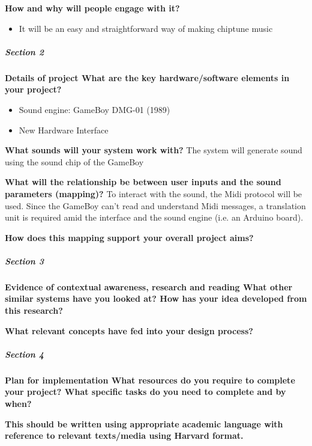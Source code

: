 \documentclass[]{article}
\begin{document}
    \textbf{How and why will people engage with it?}

        \begin{itemize}
        \item It will be an easy and straightforward way of making chiptune music
        \end{itemize}

\subparagraph[]{Section 2}

    \textbf{Details of project What are the key hardware/software elements in your
    project?}

        \begin{itemize}
            \item Sound engine: GameBoy DMG-01 (1989)
            \item New Hardware Interface
        \end{itemize}

    \textbf{What sounds will your system work with?}
    The system will generate sound using the sound chip of the GameBoy

    \textbf{What will the relationship be between user inputs and the sound 
    parameters (mapping)?} 
    To interact with the sound, the Midi protocol will be used.
    Since the GameBoy can't read and understand Midi messages,
    a translation unit is required amid the interface and the sound engine (i.e. an Arduino board).

    \textbf{How does this mapping support your overall project aims?}

\subparagraph[]{Section 3}

    \textbf{Evidence of contextual awareness, research and reading What other similar
    systems have you looked at? How has your idea developed from this research? }
    
    \textbf{What relevant concepts have fed into your design process?}

\subparagraph[]{Section 4}
    
    \textbf{Plan for implementation What resources do you require to complete your
    project? What specific tasks do you need to complete and by when?}

    \textbf{This should be written using appropriate academic language with reference
    to relevant texts/media using Harvard format.}



\end{document}
